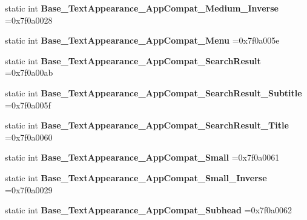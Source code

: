 \begin{DoxyCompactItemize}
static int {\bfseries Base\+\_\+\+Text\+Appearance\+\_\+\+App\+Compat\+\_\+\+Medium\+\_\+\+Inverse} =0x7f0a0028
\item 
\mbox{\label{classandroid_1_1support_1_1v7_1_1appcompat_1_1R_1_1style_a17efc4162d04eec3dfe5018efc7f745c}} 
static int {\bfseries Base\+\_\+\+Text\+Appearance\+\_\+\+App\+Compat\+\_\+\+Menu} =0x7f0a005e
\item 
\mbox{\label{classandroid_1_1support_1_1v7_1_1appcompat_1_1R_1_1style_a8e097d30fed81f992d12b37e52f46dc9}} 
static int {\bfseries Base\+\_\+\+Text\+Appearance\+\_\+\+App\+Compat\+\_\+\+Search\+Result} =0x7f0a00ab
\item 
\mbox{\label{classandroid_1_1support_1_1v7_1_1appcompat_1_1R_1_1style_a0f9fcde973255c11e5aa5b9267e246bc}} 
static int {\bfseries Base\+\_\+\+Text\+Appearance\+\_\+\+App\+Compat\+\_\+\+Search\+Result\+\_\+\+Subtitle} =0x7f0a005f
\item 
\mbox{\label{classandroid_1_1support_1_1v7_1_1appcompat_1_1R_1_1style_a3bd8fcc854d8dea67706e4bee6fd0f68}} 
static int {\bfseries Base\+\_\+\+Text\+Appearance\+\_\+\+App\+Compat\+\_\+\+Search\+Result\+\_\+\+Title} =0x7f0a0060
\item 
\mbox{\label{classandroid_1_1support_1_1v7_1_1appcompat_1_1R_1_1style_a8750b1a0f2e0e6e83ece99bb25442c58}} 
static int {\bfseries Base\+\_\+\+Text\+Appearance\+\_\+\+App\+Compat\+\_\+\+Small} =0x7f0a0061
\item 
\mbox{\label{classandroid_1_1support_1_1v7_1_1appcompat_1_1R_1_1style_ac27df3631fc5d993fbf44102ae5708f0}} 
static int {\bfseries Base\+\_\+\+Text\+Appearance\+\_\+\+App\+Compat\+\_\+\+Small\+\_\+\+Inverse} =0x7f0a0029
\item 
\mbox{\label{classandroid_1_1support_1_1v7_1_1appcompat_1_1R_1_1style_ac44e1809ff2c6385c0165fe01ba0b746}} 
static int {\bfseries Base\+\_\+\+Text\+Appearance\+\_\+\+App\+Compat\+\_\+\+Subhead} =0x7f0a0062

\end{DoxyCompactItemize}
